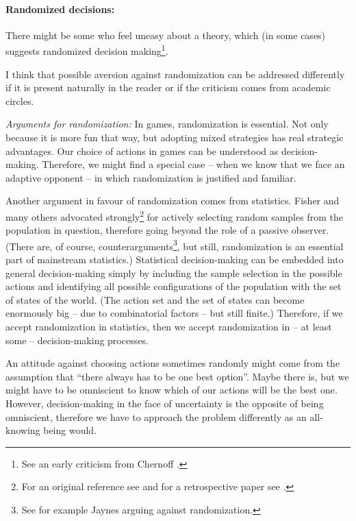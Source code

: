 \documentclass{article}
\begin{document}
\paragraph{Randomized decisions:}
There might be some who feel uneasy about a theory, which (in some cases) suggests randomized decision making\footnote{See an early criticism from Chernoff \cite{paper:Chernoff1954}.}.

I think that possible aversion against randomization can be addressed differently if it is present naturally in the reader or if the criticism comes from academic circles.

{\it Arguments for randomization:}
In games, randomization is essential. Not only because it is more fun that way, but adopting mixed strategies has real strategic advantages.
Our choice of actions in games can be understood as decision-making. Therefore, we might find a special case -- when we know that we face an adaptive opponent -- in which randomization is justified and familiar.

Another argument in favour of randomization comes from statistics. Fisher and many others advocated strongly\footnote{For an original reference see \cite{book:FisherDesignOfExperiments} and for a retrospective paper see \cite{paper:FishersDevil}.} for actively selecting random samples from the population in question, therefore going beyond the role of a passive observer. (There are, of course, counterarguments\footnote{See for example Jaynes \cite{book:Jaynes} arguing against randomization.}, but still, randomization is an essential part of mainstream statistics.)
Statistical decision-making can be embedded into general decision-making simply by including the sample selection in the possible actions and identifying all possible configurations of the population with the set of states of the world. (The action set and the set of states can become enormously big -- due to combinatorial factors -- but still finite.) Therefore, if we accept randomization in statistics, then we accept randomization in -- at least some -- decision-making processes.

An attitude against choosing actions sometimes randomly might come from the assumption that ``there always has to be one best option''. Maybe there is, but we might have to be omniscient to know which of our actions will be the best one. However, decision-making in the face of uncertainty is the opposite of being omniscient, therefore we have to approach the problem differently as an all-knowing being would.
\end{document}
